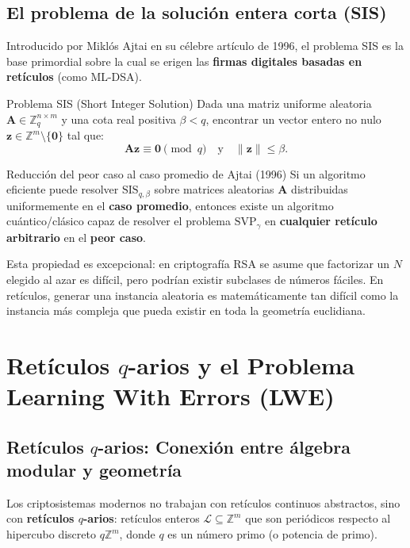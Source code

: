 \documentclass[11pt,a4paper,twoside,openright]{book}
\theoremstyle{plain}
\theoremstyle{definition}
\theoremstyle{remark}
\newcommand{\Z}{\mathbb{Z}}
\newcommand{\Zq}{\mathbb{Z}_q}
\newcommand{\vv}[1]{\mathbf{#1}}
\newcommand{\mm}[1]{\mathbf{#1}}
\newcommand{\MLDSA}{\textsf{ML-DSA}}
\begin{document}
\section{El problema de la soluci\'on entera corta (SIS)}

Introducido por Mikl\'os Ajtai en su c\'elebre art\'iculo de 1996, el problema SIS es la base primordial sobre la cual se erigen las \textbf{firmas digitales basadas en ret\'iculos} (como \MLDSA{}).

\begin{midef}{Problema SIS (Short Integer Solution)}
Dada una matriz uniforme aleatoria $\mm{A} \in \Zq^{n \times m}$ y una cota real positiva $\beta < q$, encontrar un vector entero no nulo $\vv{z} \in \Z^m \setminus \{\vv{0}\}$ tal que:
\[
  \mm{A}\vv{z} \equiv \vv{0} \pmod q \quad \text{y} \quad \|\vv{z}\| \leq \beta.
\]
\end{midef}

\begin{miteo}{Reducci\'on del peor caso al caso promedio de Ajtai (1996)}
Si un algoritmo eficiente puede resolver $\mathrm{SIS}_{q, \beta}$ sobre matrices aleatorias $\mm{A}$ distribuidas uniformemente en el \textbf{caso promedio}, entonces existe un algoritmo cu\'antico/cl\'asico capaz de resolver el problema $\mathrm{SVP}_\gamma$ en \textbf{cualquier ret\'iculo arbitrario} en el \textbf{peor caso}.
\end{miteo}

Esta propiedad es excepcional: en criptograf\'ia RSA se asume que factorizar un $N$ elegido al azar es dif\'icil, pero podr\'ian existir subclases de n\'umeros f\'aciles. En ret\'iculos, generar una instancia aleatoria es matem\'aticamente tan dif\'icil como la instancia m\'as compleja que pueda existir en toda la geometr\'ia euclidiana.

\chapter{Ret\'iculos $q$-arios y el Problema Learning With Errors (LWE)}
\label{chap:lwe_qarios}

\section{Ret\'iculos $q$-arios: Conexi\'on entre \'algebra modular y geometr\'ia}

Los criptosistemas modernos no trabajan con ret\'iculos continuos abstractos, sino con \textbf{ret\'iculos $q$-arios}: ret\'iculos enteros $\mathcal{L} \subseteq \Z^m$ que son peri\'odicos respecto al hipercubo discreto $q\Z^m$, donde $q$ es un n\'umero primo (o potencia de primo).
\end{document}
